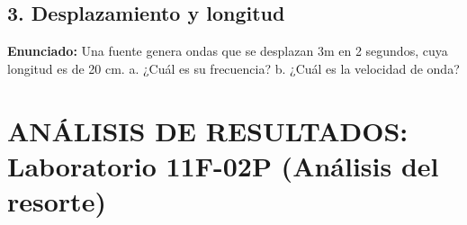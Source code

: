 \documentclass[12pt, letterpaper]{article}
\begin{document}
\subsection*{3. Desplazamiento y longitud}
\noindent \textbf{Enunciado:} Una fuente genera ondas que se desplazan 3m en 2 segundos, cuya longitud es de 20 cm. a. ¿Cuál es su frecuencia? b. ¿Cuál es la velocidad de onda?


\newpage
\section*{ANÁLISIS DE RESULTADOS: Laboratorio 11F-02P (Análisis del resorte)}
\end{document}
